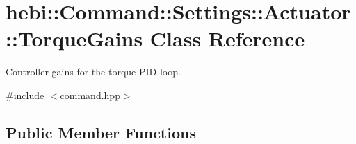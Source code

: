\hypertarget{classhebi_1_1Command_1_1Settings_1_1Actuator_1_1TorqueGains}{}\section{hebi\+:\+:Command\+:\+:Settings\+:\+:Actuator\+:\+:Torque\+Gains Class Reference}
\label{classhebi_1_1Command_1_1Settings_1_1Actuator_1_1TorqueGains}


Controller gains for the torque P\+ID loop.  




{\ttfamily \#include $<$command.\+hpp$>$}

\subsection*{Public Member Functions}
